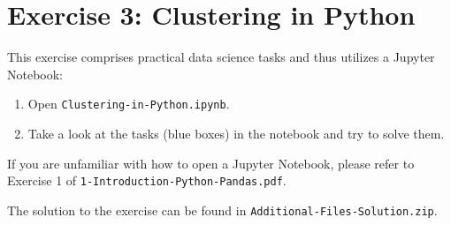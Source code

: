 \documentclass[
english,
smallborders
]{i6prcsht}
\begin{document}
\newpage

\section*{Exercise 3: Clustering in Python}

This exercise comprises practical data science tasks and thus utilizes a Jupyter Notebook:

\begin{enumerate}
	\item Open \texttt{Clustering-in-Python.ipynb}.
	\item Take a look at the tasks (blue boxes) in the notebook and try to solve them.
\end{enumerate}

If you are unfamiliar with how to open a Jupyter Notebook, please refer to Exercise 1 of \texttt{1-Introduction-Python-Pandas.pdf}.

\begin{solution}
	The solution to the exercise can be found in \texttt{Additional-Files-Solution.zip}.
\end{solution}
\end{document}
